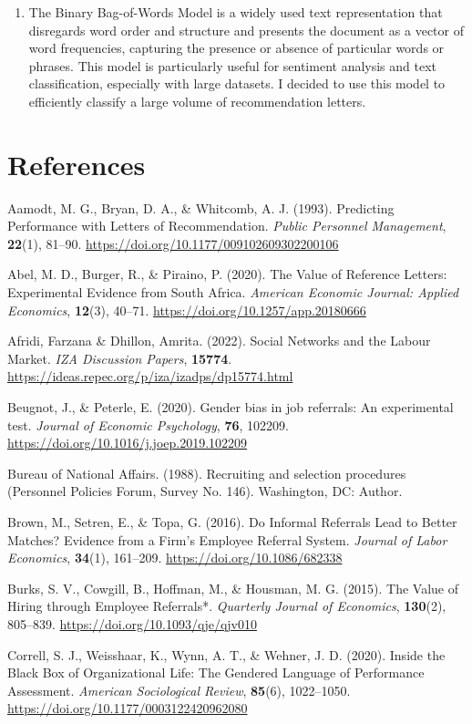 \documentclass[12pt]{caltech_thesis}
\begin{document}
\begin{enumerate}
    \item The Binary Bag-of-Words Model is a widely used text representation that disregards word order and structure and presents the document as a vector of word frequencies, capturing the presence or absence of particular words or phrases. This model is particularly useful for sentiment analysis and text classification, especially with large datasets. I decided to use this model to efficiently classify a large volume of recommendation letters.
\end{enumerate}


\chapter{References}
    Aamodt, M. G., Bryan, D. A., \& Whitcomb, A. J. (1993). Predicting Performance with Letters of Recommendation. \textit{Public Personnel Management}, \textbf{22}(1), 81--90. \url{https://doi.org/10.1177/009102609302200106}
   
    Abel, M. D., Burger, R., \& Piraino, P. (2020). The Value of Reference Letters: Experimental Evidence from South Africa. \textit{American Economic Journal: Applied Economics}, \textbf{12}(3), 40--71. \url{https://doi.org/10.1257/app.20180666}
   
    Afridi, Farzana \& Dhillon, Amrita. (2022). Social Networks and the Labour Market. \textit{IZA Discussion Papers}, \textbf{15774}. \url{https://ideas.repec.org/p/iza/izadps/dp15774.html}
   
    Beugnot, J., \& Peterle, E. (2020). Gender bias in job referrals: An experimental test. \textit{Journal of Economic Psychology}, \textbf{76}, 102209. \url{https://doi.org/10.1016/j.joep.2019.102209}
   
    Bureau of National Affairs. (1988). Recruiting and selection procedures (Personnel Policies Forum, Survey No. 146). Washington, DC: Author.
   
    Brown, M., Setren, E., \& Topa, G. (2016). Do Informal Referrals Lead to Better Matches? Evidence from a Firm's Employee Referral System. \textit{Journal of Labor Economics}, \textbf{34}(1), 161--209. \url{https://doi.org/10.1086/682338}
   
    Burks, S. V., Cowgill, B., Hoffman, M., \& Housman, M. G. (2015). The Value of Hiring through Employee Referrals*. \textit{Quarterly Journal of Economics}, \textbf{130}(2), 805--839. \url{https://doi.org/10.1093/qje/qjv010}
   
    Correll, S. J., Weisshaar, K., Wynn, A. T., \& Wehner, J. D. (2020). Inside the Black Box of Organizational Life: The Gendered Language of Performance Assessment. \textit{American Sociological Review}, \textbf{85}(6), 1022--1050. \url{https://doi.org/10.1177/0003122420962080}
   
\end{document}
